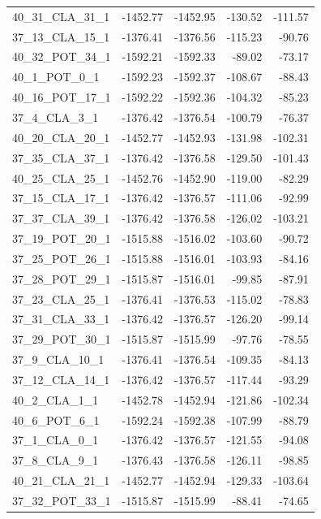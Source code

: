 \documentclass[journal=jacsat,manuscript=article]{achemso}
\begin{document}
\begin{table}[b!]
\begin{tabular}{lrrrr}
40\_31\_CLA\_31\_1 &  -1452.77 &  -1452.95 & -130.52 & -111.57 \\
37\_13\_CLA\_15\_1 &  -1376.41 &  -1376.56 & -115.23 &  -90.76 \\
40\_32\_POT\_34\_1 &  -1592.21 &  -1592.33 &  -89.02 &  -73.17 \\
40\_1\_POT\_0\_1   &  -1592.23 &  -1592.37 & -108.67 &  -88.43 \\
40\_16\_POT\_17\_1 &  -1592.22 &  -1592.36 & -104.32 &  -85.23 \\
37\_4\_CLA\_3\_1   &  -1376.42 &  -1376.54 & -100.79 &  -76.37 \\
40\_20\_CLA\_20\_1 &  -1452.77 &  -1452.93 & -131.98 & -102.31 \\
37\_35\_CLA\_37\_1 &  -1376.42 &  -1376.58 & -129.50 & -101.43 \\
40\_25\_CLA\_25\_1 &  -1452.76 &  -1452.90 & -119.00 &  -82.29 \\
37\_15\_CLA\_17\_1 &  -1376.42 &  -1376.57 & -111.06 &  -92.99 \\
37\_37\_CLA\_39\_1 &  -1376.42 &  -1376.58 & -126.02 & -103.21 \\
37\_19\_POT\_20\_1 &  -1515.88 &  -1516.02 & -103.60 &  -90.72 \\
37\_25\_POT\_26\_1 &  -1515.88 &  -1516.01 & -103.93 &  -84.16 \\
37\_28\_POT\_29\_1 &  -1515.87 &  -1516.01 &  -99.85 &  -87.91 \\
37\_23\_CLA\_25\_1 &  -1376.41 &  -1376.53 & -115.02 &  -78.83 \\
37\_31\_CLA\_33\_1 &  -1376.42 &  -1376.57 & -126.20 &  -99.14 \\
37\_29\_POT\_30\_1 &  -1515.87 &  -1515.99 &  -97.76 &  -78.55 \\
37\_9\_CLA\_10\_1  &  -1376.41 &  -1376.54 & -109.35 &  -84.13 \\
37\_12\_CLA\_14\_1 &  -1376.42 &  -1376.57 & -117.44 &  -93.29 \\
40\_2\_CLA\_1\_1   &  -1452.78 &  -1452.94 & -121.86 & -102.34 \\
40\_6\_POT\_6\_1   &  -1592.24 &  -1592.38 & -107.99 &  -88.79 \\
37\_1\_CLA\_0\_1   &  -1376.42 &  -1376.57 & -121.55 &  -94.08 \\
37\_8\_CLA\_9\_1   &  -1376.43 &  -1376.58 & -126.11 &  -98.85 \\
40\_21\_CLA\_21\_1 &  -1452.77 &  -1452.94 & -129.33 & -103.64 \\
37\_32\_POT\_33\_1 &  -1515.87 &  -1515.99 &  -88.41 &  -74.65 \\

\end{tabular}
\end{table}
\end{document}
